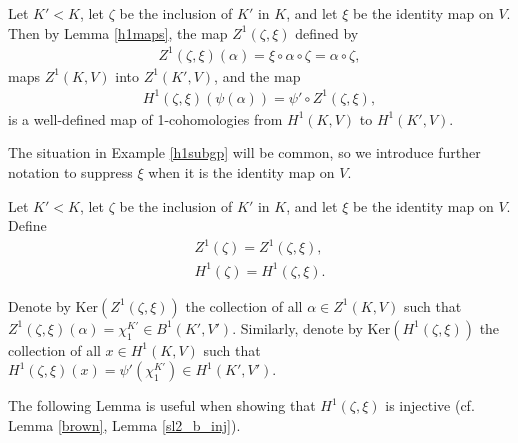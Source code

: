 \begin{example} \label{h1subgp}
	Let $K' < K$, let $\zeta$ be the inclusion of $K'$ in $K$, and let $\xi$ be the identity map on $V$. Then by Lemma \ref{h1maps}, the map $Z^1(\zeta, \xi)$ defined by
\begin{align*}
	Z^1(\zeta, \xi)(\alpha) = \xi \circ \alpha \circ \zeta = \alpha \circ \zeta,
\end{align*}
maps $Z^1(K, V)$ into $Z^1(K', V)$, and the map
\begin{align*}
	H^1(\zeta, \xi)(\psi(\alpha)) = \psi' \circ Z^1(\zeta, \xi),
\end{align*}
is a well-defined map of 1-cohomologies from $H^1(K, V)$ to $H^1(K', V)$. 
\end{example}

The situation in Example \ref{h1subgp} will be common, so we introduce further notation to suppress $\xi$ when it is the identity map on $V$.
\begin{definition} Let $K' < K$, let $\zeta$ be the inclusion of $K'$ in $K$, and let $\xi$ be the identity map on $V$. Define
\begin{align*}
	Z^1(\zeta) = Z^1(\zeta, \xi), \\
	H^1(\zeta) = H^1(\zeta, \xi).
\end{align*}
\end{definition}

\begin{definition} Denote by $\mathrm{Ker}\left(Z^1(\zeta, \xi)\right)$ the collection of all $\alpha\in Z^1(K, V)$ such that $Z^1(\zeta, \xi)(\alpha) = \chi^{K'}_1 \in B^1(K', V')$. Similarly, denote by $\mathrm{Ker}\left(H^1(\zeta, \xi)\right)$ the collection of all $x \in H^1(K, V)$ such that $H^1(\zeta, \xi)(x) = \psi'\left(\chi^{K'}_1\right)\in H^1(K', V')$.
\end{definition}

The following Lemma is useful when showing that $H^1(\zeta, \xi)$ is injective (cf. Lemma \ref{brown}, Lemma \ref{sl2_b_inj}).

